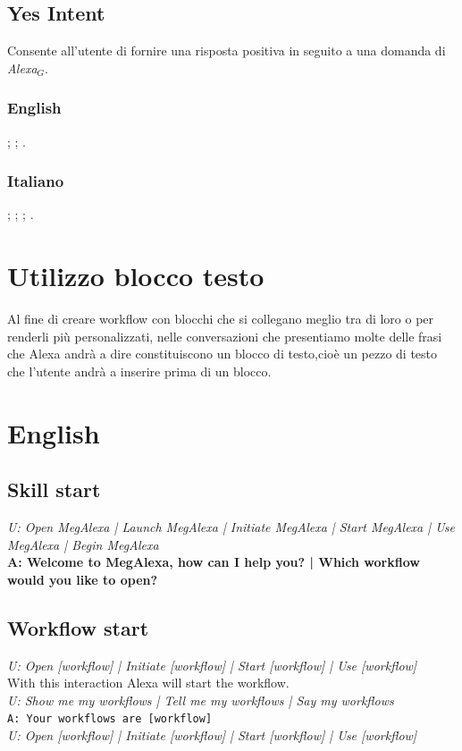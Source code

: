 \subsection{Yes Intent}
Consente all'utente di fornire una risposta positiva in seguito a una domanda di \textit{Alexa$_{G}$}.
\subsubsection{English}
\begin{itemize}
	
	;
	;
	.
	
\end{itemize}

\subsubsection{Italiano}
\begin{itemize}
	;
	;
	;
	.		
\end{itemize}

\section{Utilizzo blocco testo }
Al fine di creare workflow con blocchi che si collegano meglio tra di loro o per renderli più personalizzati,
nelle conversazioni che presentiamo molte delle frasi che Alexa andrà a dire constituiscono un blocco di testo,cioè un pezzo di testo che l'utente andrà a inserire prima di un blocco.

\section{English}
\subsection{Skill start} \label{SkillStart}
\textit{U: Open MegAlexa | Launch MegAlexa | Initiate MegAlexa | Start MegAlexa | Use MegAlexa | Begin MegAlexa}\\
\textbf{A: Welcome to MegAlexa, how can I help you? | Which workflow would you like to open?}

\subsection{Workflow start}
\textit{U: Open [workflow] | Initiate [workflow] | Start [workflow] | Use [workflow]}\\
With this interaction Alexa will start the workflow. \\
\textit{U: Show me my workflows | Tell me my workflows | Say my workflows}\\
\texttt{A: Your workflows are [workflow]}\\
\textit{U: Open [workflow] | Initiate [workflow] | Start [workflow] | Use [workflow]}

